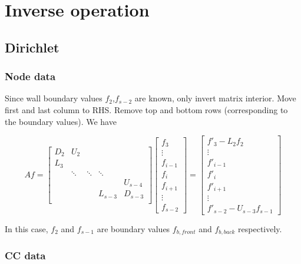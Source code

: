 \documentclass[11pt]{article}
\begin{document}
\section{Inverse operation}
\subsection{Dirichlet}

\subsubsection{Node data}

Since wall boundary values $f_2$,$f_{s-2}$ are known, only invert matrix interior. Move first and last column to RHS. Remove top and bottom rows (corresponding to the boundary values). We have

\[ Af = \left[
\begin{array}{ccccccccc}
D_{2} &  U_{2}   &          &          &          \\
L_{3} &          &          &          &          \\
      &  \ddots  &  \ddots  &  \ddots  &          \\
      &          &          &          &  U_{s-4} \\
      &          &          &  L_{s-3} &  D_{s-3} \\
\end{array} \right]
\left[ \begin{array}{c}
f_{3} \\ \vdots \\ f_{i-1} \\ f_{i} \\ f_{i+1} \\ \vdots \\ f_{s-2}
\end{array} \right]
=
\left[ \begin{array}{c}
f'_{3} - L_2 f_{2} \\ \vdots \\ f'_{i-1} \\ f'_{i} \\ f'_{i+1} \\ \vdots \\ f'_{s-2} - U_{s-3} f_{s-1}
\end{array} \right]
\]

In this case, $f_2$ and $f_{s-1}$ are boundary values $f_{b,front}$ and $f_{b,back}$ respectively.

\subsubsection{CC data}
\end{document}
